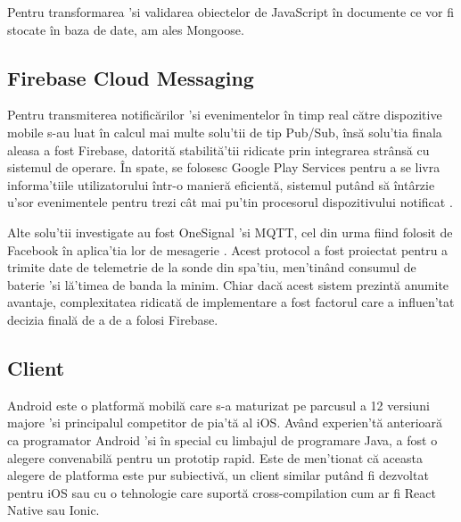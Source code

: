 Pentru transformarea 'si validarea obiectelor de JavaScript în documente ce vor fi stocate în baza de date, am ales Mongoose.


\subsection {Firebase Cloud Messaging}

Pentru transmiterea notificărilor 'si evenimentelor în timp real către dispozitive mobile s-au luat în calcul mai multe solu'tii de tip Pub/Sub, însă solu'tia finala aleasa a fost Firebase, datorită stabilită'tii ridicate prin integrarea strânsă cu sistemul de operare. În spate, se folosesc Google Play Services pentru a se livra informa'tiile utilizatorului într-o manieră eficientă, sistemul putând să  întârzie u'sor evenimentele pentru trezi cât mai pu'tin procesorul dispozitivului notificat \cite{FirebaseGoogle2022}.

Alte solu'tii investigate au fost OneSignal 'si MQTT, cel din urma fiind folosit de Facebook în aplica'tia lor de mesagerie \cite{LucyZhang2021}. Acest protocol a fost proiectat pentru a trimite date de telemetrie de la sonde din spa'tiu, men'tinând consumul de baterie 'si lă'timea de banda la minim. Chiar dacă acest sistem prezintă anumite avantaje, complexitatea ridicată de implementare a fost factorul care a influen'tat decizia finală de a de a folosi Firebase. 

\subsection {Client}

Android este o platformă mobilă care s-a maturizat pe parcusul a 12 versiuni majore 'si principalul competitor de pia'tă al iOS. Având experien'tă anterioară ca programator Android 'si în special cu limbajul de programare Java, a fost o alegere convenabilă pentru un prototip rapid.
Este de men'tionat că aceasta alegere de platforma este pur subiectivă, un client similar putând fi dezvoltat pentru iOS sau cu o tehnologie care suportă cross-compilation cum ar fi React Native sau Ionic.
